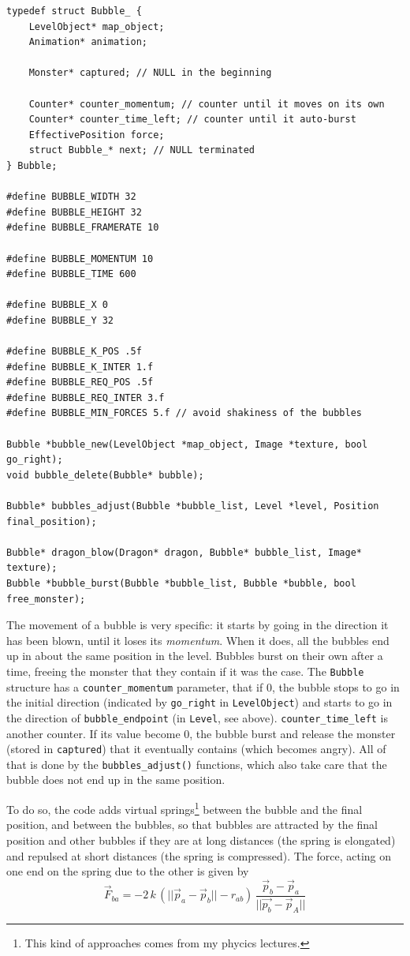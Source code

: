 \documentclass[12pt,a4paper]{article}
\newcommand{\cc}[1]{\texttt{#1}}
\begin{document}
\begin{verbatim}
typedef struct Bubble_ {
    LevelObject* map_object;
    Animation* animation;

    Monster* captured; // NULL in the beginning

    Counter* counter_momentum; // counter until it moves on its own
    Counter* counter_time_left; // counter until it auto-burst
    EffectivePosition force;
    struct Bubble_* next; // NULL terminated
} Bubble;

#define BUBBLE_WIDTH 32
#define BUBBLE_HEIGHT 32
#define BUBBLE_FRAMERATE 10

#define BUBBLE_MOMENTUM 10
#define BUBBLE_TIME 600

#define BUBBLE_X 0
#define BUBBLE_Y 32

#define BUBBLE_K_POS .5f
#define BUBBLE_K_INTER 1.f
#define BUBBLE_REQ_POS .5f
#define BUBBLE_REQ_INTER 3.f
#define BUBBLE_MIN_FORCES 5.f // avoid shakiness of the bubbles

Bubble *bubble_new(LevelObject *map_object, Image *texture, bool go_right);
void bubble_delete(Bubble* bubble);

Bubble* bubbles_adjust(Bubble *bubble_list, Level *level, Position final_position);

Bubble* dragon_blow(Dragon* dragon, Bubble* bubble_list, Image* texture);
Bubble *bubble_burst(Bubble *bubble_list, Bubble *bubble, bool free_monster);
\end{verbatim}

The movement of a bubble is very specific: it starts by going in the direction it has been blown, until it loses its \textit{momentum}. When it does, all the bubbles end up in about the same position in the level. Bubbles burst on their own after a time, freeing the monster that they contain if it was the case. The \cc{Bubble} structure has a \cc{counter_momentum} parameter, that if 0, the bubble stops to go in the initial direction (indicated by \cc{go_right} in \cc{LevelObject}) and starts to go in the direction of \cc{bubble_endpoint} (in \cc{Level}, see above). \cc{counter_time_left} is another counter. If its value become 0, the bubble burst and release the monster (stored in \cc{captured}) that it eventually contains (which becomes angry). All of that is done by the \cc{bubbles_adjust()} functions, which also take care that the bubble does not end up in the same position.

To do so, the code adds virtual springs\footnote{This kind of approaches comes from my phycics lectures.} between the bubble and the final position, and between the bubbles, so that bubbles are attracted by the final position and other bubbles if they are at long distances (the spring is elongated) and repulsed at short distances (the spring is compressed). The force, acting on one end on the spring due to the other is given by\begin{equation}
\vec{F}_{ba}  = -2\,k\,(||\vec{p}_a-\vec{p}_b||-r_{ab})\,\frac{\vec{p}_b-\vec{p}_a}{||\vec{p_b}-\vec{p}_A||}
\end{equation}
\end{document}
